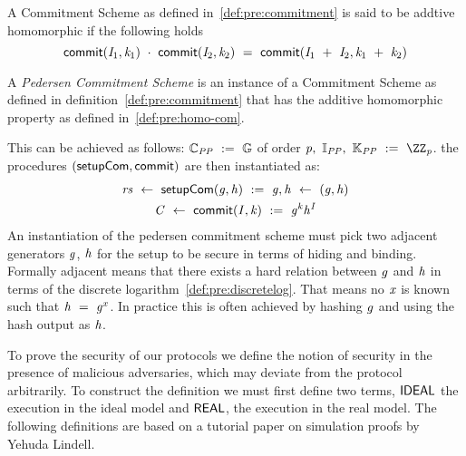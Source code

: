 \begin{definition}\label{def:pre:homo-com}
    A Commitment Scheme as defined in~\ref{def:pre:commitment} is said to be addtive homomorphic if the following holds~\cite{bunz2018bulletproofs}
    \[ \mathsf{commit}(\mathit{I}_1, \mathit{k}_1) ~\cdot~ \mathsf{commit}(\mathit{I}_2, \mathit{k}_2) ~=~ \mathsf{commit}(\mathit{I}_1 ~+~ \mathit{I}_2, \mathit{k}_1 ~+~ \mathit{k}_2) \]
\end{definition}

\begin{definition}\label{def:pre:pedersen}
    A \emph{Pedersen Commitment Scheme} is an instance of a Commitment Scheme as defined in definition~\ref{def:pre:commitment} that has the additive homomorphic property as defined in~\ref{def:pre:homo-com}.

This can be achieved as follows:
    $\mathbb{C}_{\mathit{PP}} ~:=~ \mathbb{G}$ of order $\varPrime \opSeperate \varInputSpace_{\varPublicParam} \opSeperate \varRandSpace_{\varPublicParam} \opAssign \cnstIntegersPrime{\varPrime}$.
    the procedures $(\mathsf{setupCom}, \mathsf{commit})$ are then instantiated as:
    \begin{gather*}
        \mathit{rs} ~\leftarrow~ \mathsf{setupCom} (\mathit{g},\mathit{h}) ~:=~ \mathit{g}, \mathit{h} ~\leftarrow~ (\mathit{g}, \mathit{h})\\
        \mathit{C} ~\leftarrow~ \mathsf{commit}(\mathit{I}, \mathit{k}) ~:=~ \mathit{g}^{\mathit{k}} \mathit{h}^{\mathit{I}}\\
    \end{gather*}
    An instantiation of the pedersen commitment scheme must pick two adjacent generators $\mathit{g}$, $\mathit{h}$ for the setup to be secure in terms of hiding and binding.
    Formally adjacent means that there exists a hard relation between $\mathit{g}$ and $\mathit{h}$ in terms of the discrete logarithm~\ref{def:pre:discretelog}.
That means no $\mathit{x}$ is known such that $\mathit{h} ~=~ \mathit{g}^{x}$.
    In practice this is often achieved by hashing $\mathit{g}$ and using the hash output as $\mathit{h}$.

\end{definition}

To prove the security of our protocols we define the notion of security in the presence of malicious adversaries, which may deviate from the protocol arbitrarily.
To construct the definition we must first define two terms, $\mathsf{IDEAL}$ the execution in the ideal model and $\mathsf{REAL}$, the execution in the real model.
The following definitions are based on a tutorial paper on simulation proofs by Yehuda Lindell.~\cite{lindell2017simulate}

